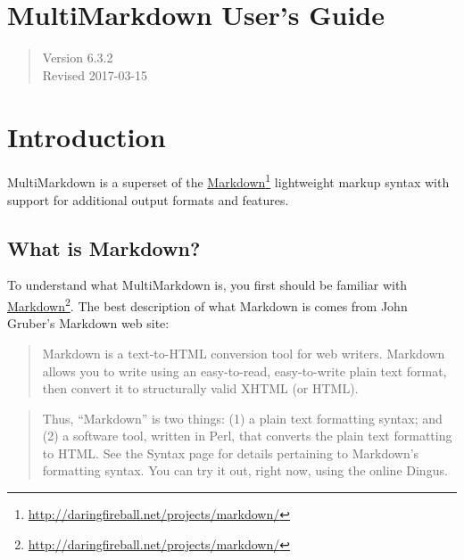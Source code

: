 
\def\mytitle{MultiMarkdown User's Guide}
\def\latextitle{MultiMarkdown \\ User's Guide}
\def\myauthor{Fletcher T. Penney}
\def\version{6.3.2}
\def\revised{2017-03-15}
\def\uuid{88e8f53c-9a02-4e49-a639-f2dbb0a2e338}




\chapter{MultiMarkdown User's Guide }
\label{title}

\begin{quote}
Version 6.3.2\\
Revised 2017-03-15
\end{quote}

\chapter{Introduction }
\label{introduction}

MultiMarkdown is a superset of the \href{http://daringfireball.net/projects/markdown/}{Markdown}\footnote{\href{http://daringfireball.net/projects/markdown/}{http:\slash \slash daringfireball.net\slash projects\slash markdown\slash }} lightweight markup syntax with support for additional output formats and features.

\section{What is Markdown? }
\label{whatismarkdown}

To understand what MultiMarkdown is, you first should be familiar with
\href{http://daringfireball.net/projects/markdown/}{Markdown}\footnote{\href{http://daringfireball.net/projects/markdown/}{http:\slash \slash daringfireball.net\slash projects\slash markdown\slash }}. The best description of what Markdown is comes from John Gruber's
Markdown web site:

\begin{quote}
Markdown is a text-to-HTML conversion tool for web writers. Markdown
allows you to write using an easy-to-read, easy-to-write plain text
format, then convert it to structurally valid XHTML (or HTML).
\end{quote}

\begin{quote}
Thus, ``Markdown'' is two things: (1) a plain text formatting
syntax; and (2) a software tool, written in Perl, that converts
the plain text formatting to HTML. See the Syntax page for details
pertaining to Markdown's formatting syntax. You can try it out,
right now, using the online Dingus.
\end{quote}

